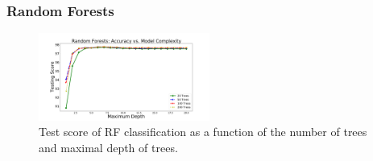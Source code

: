 \subsubsection{Random Forests}


\begin{figure}[h]
\hspace*{-0.5cm}
\includegraphics[width=0.5\textwidth]{plots/rf_train}
\caption{
Test score of RF classification as a function of the number of trees and maximal depth of trees.
}
\label{fig:RF_complexity}
\end{figure}


